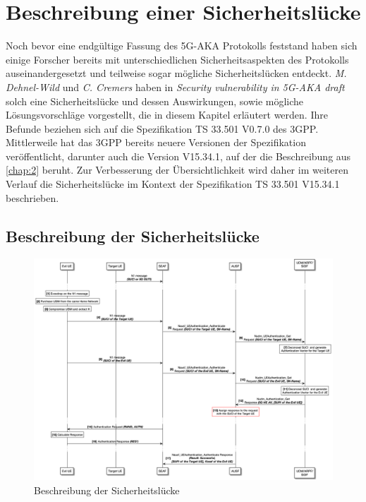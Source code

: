 \chapter{Beschreibung einer Sicherheitsl\"ucke}
\label{chap:4}

Noch bevor eine endgültige Fassung des 5G-AKA Protokolls feststand haben sich einige Forscher bereits mit unterschiedlichen Sicherheitsaspekten des Protokolls auseinandergesetzt und teilweise sogar mögliche Sicherheitslücken entdeckt.
\textit{M. Dehnel-Wild} und \textit{C. Cremers} haben in \textit{Security vulnerability in 5G-AKA draft} solch eine Sicherheitslücke und dessen Auswirkungen, sowie mögliche Lösungsvorschläge vorgestellt, die in diesem Kapitel erläutert werden. %
Ihre Befunde beziehen sich auf die Spezifikation TS 33.501 V0.7.0 des 3GPP. %
Mittlerweile hat das 3GPP bereits neuere Versionen der Spezifikation veröffentlicht, darunter auch die Version V15.34.1, auf der die Beschreibung aus \cref{chap:2} beruht. %
Zur Verbesserung der Übersichtlichkeit wird daher im weiteren Verlauf die Sicherheitslücke im Kontext der Spezifikation TS 33.501 V15.34.1 beschrieben.


\section{Beschreibung der Sicherheitslücke}

\begin{figure}[H]
  \centering
  \includegraphics[width=\textwidth]{uml/vulnerability_v1.png}
  \caption{Beschreibung der Sicherheitslücke}
  \label{fig:vulnerability_v1}
\end{figure}

